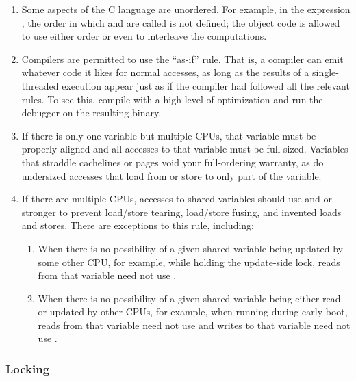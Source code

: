 \begin{enumerate}
\item	Some aspects of the C language are unordered.
	For example, in the expression , the order in
	which  and  are called is not defined; the object
	code is allowed to use either order or even to interleave the
	computations.

\item	Compilers are permitted to use the ``as-if'' rule.
	That is, a compiler can emit whatever code it likes for normal accesses,
	as long as the results of a single-threaded execution appear
	just as if the compiler had followed all the relevant rules.
	To see this, compile with a high level of optimization and run
	the debugger on the resulting binary.

\item	If there is only one variable but multiple CPUs, that variable
	must be properly aligned and all accesses to that variable must
	be full sized.
	Variables that straddle cachelines or pages void your full-ordering
	warranty, as do undersized accesses that load from or store to only
	part of the variable.

\item	If there are multiple CPUs, accesses to shared variables should
	use  and  or stronger to prevent
	load/store tearing, load/store fusing, and invented loads and stores.
	There are exceptions to this rule, including:

	\begin{enumerate}
	\item	When there is no possibility of a given shared variable
		being updated by some other CPU, for example, while
		holding the update-side lock, reads from that variable
		need not use .

	\item	When there is no possibility of a given shared variable
		being either read or updated by other CPUs, for example,
		when running during early boot, reads from that variable
		need not use  and writes to that variable
		need not use .
	\end{enumerate}
\end{enumerate}


\subsubsection{Locking}

